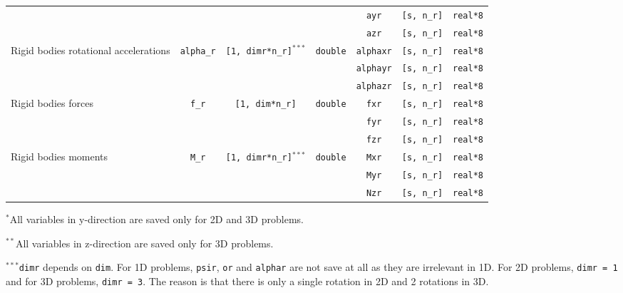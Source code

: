 {\begin{tabular}{|l|c|c|c|c|c|c|}
& & & & \texttt{ayr} & \texttt{[s, n\_r]}& \texttt{real*8} \\ \cline{5-7}
& & & & \texttt{azr} & \texttt{[s, n\_r]}& \texttt{real*8} \\ \hline
\multirow{3}{1in}{Rigid bodies rotational accelerations} & \multirow{3}{*}{\texttt{alpha\_r}} & \multirow{3}{*}{\texttt{[1, dimr*n\_r]}$^{***}$} & \multirow{3}{*}{\texttt{double}} & \texttt{alphaxr} & \texttt{[s, n\_r]}& \texttt{real*8}\\ \cline{5-7}
& & & & \texttt{alphayr} & \texttt{[s, n\_r]}& \texttt{real*8} \\ \cline{5-7}
& & & & \texttt{alphazr} & \texttt{[s, n\_r]}& \texttt{real*8} \\ \hline
\multirow{3}{1in}{Rigid bodies forces} & \multirow{3}{*}{\texttt{f\_r}} & \multirow{3}{*}{\texttt{[1, dim*n\_r]}} & \multirow{3}{*}{\texttt{double}} & \texttt{fxr} & \texttt{[s, n\_r]}& \texttt{real*8}\\ \cline{5-7}
& & & & \texttt{fyr} & \texttt{[s, n\_r]}& \texttt{real*8} \\ \cline{5-7}
& & & & \texttt{fzr} & \texttt{[s, n\_r]}& \texttt{real*8} \\ \hline
\multirow{3}{1in}{Rigid bodies moments} & \multirow{3}{*}{\texttt{M\_r}} & \multirow{3}{*}{\texttt{[1, dimr*n\_r]}$^{***}$} & \multirow{3}{*}{\texttt{double}} & \texttt{Mxr} & \texttt{[s, n\_r]}& \texttt{real*8}\\ \cline{5-7}
& & & & \texttt{Myr} & \texttt{[s, n\_r]}& \texttt{real*8} \\ \cline{5-7}
& & & & \texttt{Nzr} & \texttt{[s, n\_r]}& \texttt{real*8} \\ \hline
\end{tabular}
}

$^*$All variables in y-direction are saved only for 2D and 3D problems.

$^{**}$All variables in z-direction are saved only for 3D problems.

$^{***}$\texttt{dimr} depends on \texttt{dim}. For 1D problems, \texttt{psir}, \texttt{or} and \texttt{alphar} are not save at all as they are irrelevant in 1D. For 2D problems, \texttt{dimr = 1} and for 3D problems, \texttt{dimr = 3}. The reason is that there is only a single rotation in 2D and 2 rotations in 3D.


